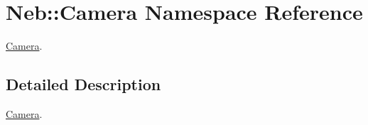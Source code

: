 \hypertarget{namespaceNeb_1_1Camera}{\section{\-Neb\-:\-:\-Camera \-Namespace \-Reference}
\label{namespaceNeb_1_1Camera}
}


\hyperlink{namespaceNeb_1_1Camera}{\-Camera}.  




\subsection{\-Detailed \-Description}
\hyperlink{namespaceNeb_1_1Camera}{\-Camera}. 
